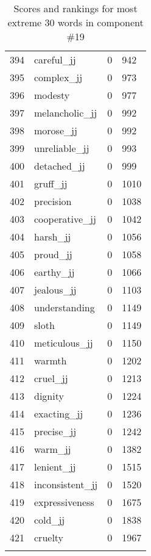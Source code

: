 \begin{longtable}[!htbp]{| rlr@{.}l |}
    394 & careful\_jj & 0 & 942 \\
    395 & complex\_jj & 0 & 973 \\
    396 & modesty & 0 & 977 \\
    397 & melancholic\_jj & 0 & 992 \\
    398 & morose\_jj & 0 & 992 \\
    399 & unreliable\_jj & 0 & 993 \\
    400 & detached\_jj & 0 & 999 \\
    401 & gruff\_jj & 0 & 1010 \\
    402 & precision & 0 & 1038 \\
    403 & cooperative\_jj & 0 & 1042 \\
    404 & harsh\_jj & 0 & 1056 \\
    405 & proud\_jj & 0 & 1058 \\
    406 & earthy\_jj & 0 & 1066 \\
    407 & jealous\_jj & 0 & 1103 \\
    408 & understanding & 0 & 1149 \\
    409 & sloth & 0 & 1149 \\
    410 & meticulous\_jj & 0 & 1150 \\
    411 & warmth & 0 & 1202 \\
    412 & cruel\_jj & 0 & 1213 \\
    413 & dignity & 0 & 1224 \\
    414 & exacting\_jj & 0 & 1236 \\
    415 & precise\_jj & 0 & 1242 \\
    416 & warm\_jj & 0 & 1382 \\
    417 & lenient\_jj & 0 & 1515 \\
    418 & inconsistent\_jj & 0 & 1520 \\
    419 & expressiveness & 0 & 1675 \\
    420 & cold\_jj & 0 & 1838 \\
    421 & cruelty & 0 & 1967 \\
    \hline
    \caption{Scores and rankings for most extreme 30 words in component \#19} \\
\end{longtable}
